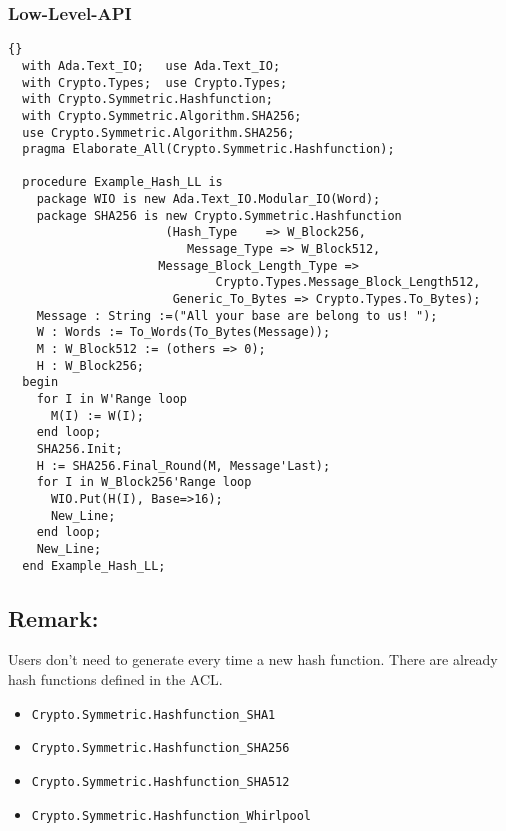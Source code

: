 \subsubsection*{Low-Level-API}
\begin{lstlisting}{}
  with Ada.Text_IO;   use Ada.Text_IO;
  with Crypto.Types;  use Crypto.Types;
  with Crypto.Symmetric.Hashfunction;
  with Crypto.Symmetric.Algorithm.SHA256;
  use Crypto.Symmetric.Algorithm.SHA256;
  pragma Elaborate_All(Crypto.Symmetric.Hashfunction);

  procedure Example_Hash_LL is
    package WIO is new Ada.Text_IO.Modular_IO(Word);
    package SHA256 is new Crypto.Symmetric.Hashfunction
    			      (Hash_Type    => W_Block256,
			    		 Message_Type => W_Block512,
		             Message_Block_Length_Type => 
				             Crypto.Types.Message_Block_Length512,
    			       Generic_To_Bytes => Crypto.Types.To_Bytes);
    Message : String :=("All your base are belong to us! ");
    W : Words := To_Words(To_Bytes(Message));
    M : W_Block512 := (others => 0);
    H : W_Block256;
  begin
    for I in W'Range loop
      M(I) := W(I);
    end loop;
    SHA256.Init;
    H := SHA256.Final_Round(M, Message'Last);
    for I in W_Block256'Range loop
      WIO.Put(H(I), Base=>16);
      New_Line;
    end loop;
    New_Line;
  end Example_Hash_LL;
\end{lstlisting}
\subsection*{Remark:}
Users don't need to generate every time a new hash function. There are
already hash functions defined in the ACL.
\begin{itemize}
\item \texttt{Crypto.Symmetric.Hashfunction\_SHA1}
\item \texttt{Crypto.Symmetric.Hashfunction\_SHA256}
\item \texttt{Crypto.Symmetric.Hashfunction\_SHA512}
\item \texttt{Crypto.Symmetric.Hashfunction\_Whirlpool}
\end{itemize}
